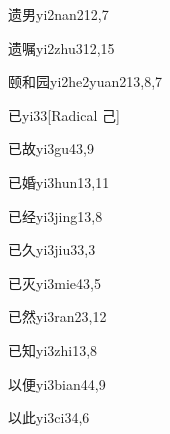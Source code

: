 \begin{verbete}{遗男}{yi2nan2}{12,7}
\end{verbete}

\begin{verbete}{遗嘱}{yi2zhu3}{12,15}
\end{verbete}

\begin{verbete}{颐和园}{yi2he2yuan2}{13,8,7}
\end{verbete}

\begin{verbete}{已}{yi3}{3}[Radical 己]
\end{verbete}

\begin{verbete}{已故}{yi3gu4}{3,9}
\end{verbete}

\begin{verbete}{已婚}{yi3hun1}{3,11}
\end{verbete}

\begin{verbete}{已经}{yi3jing1}{3,8}
\end{verbete}

\begin{verbete}{已久}{yi3jiu3}{3,3}
\end{verbete}

\begin{verbete}{已灭}{yi3mie4}{3,5}
\end{verbete}

\begin{verbete}{已然}{yi3ran2}{3,12}
\end{verbete}

\begin{verbete}{已知}{yi3zhi1}{3,8}
\end{verbete}

\begin{verbete}{以便}{yi3bian4}{4,9}
\end{verbete}

\begin{verbete}{以此}{yi3ci3}{4,6}
\end{verbete}

